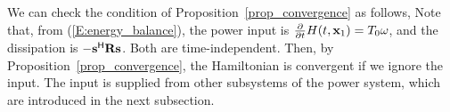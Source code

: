 \begin{comment}
Note that, compared to the system considered in Section~\ref{sec_contraction}, the SG system has the additional state variable $\theta$ which does not affect the definition of the Hamiltonian, i.e., $\frac{\partial H}{\partial \theta} = 0$. However, it can be easily checked that all the machinery from Section~\ref{sec_contraction} still works for the system (\ref{E:SM_model}) if we (i) use the equations for $\vect x$ to generate the equivalence classes, i.e., using
\begin{align*}
    \begin{bmatrix}[1.2]
        \dot{\vect x}_1(\tau) \\
        \dot\theta(\tau)
    \end{bmatrix} &= \begin{bmatrix}
        \mathcal W \left[ (\matr J(\vect x(\tau)) - \matr R) \nabla H(t, \vect x_1(\tau)) + \matr G \vect u(\tau)\right] \\
        \omega(\tau)
    \end{bmatrix} \\
    \vect y(\tau) &= \matr G^\herm \nabla H(t, \vect x_1(\tau)),
\end{align*}
where $\vect u(\tau)$ is supplied from the other open subsystems,
and (ii) only include $\vect x_1$ in the definition of the quotient distance in (\ref{E:projection}), i.e.,
\begin{equation*}
    \mathcal P(t, \vect x) \begin{bmatrix}
        0 \\
        0 \\
        1
    \end{bmatrix} = 0_3.
\end{equation*}
In particular, the system (\ref{E:SM_model}) without considering the input $\vect u$, is HC if $\matr R > 0$ and $D^2 H(t, \vect x_1) \geq c > 0$, which are true. The input is supplied from other subsystems of the power system, which are introduced in the next subsection.
\end{comment}


We can check the condition of Proposition~\ref{prop_convergence} as follows, Note that, from (\ref{E:energy_balance}), the power input is
$\frac{\partial}{\partial t} H(t, \mathbf{x}_1) = T_0 \omega$,
and the dissipation is
$-\mathbf{s}^{\mathsf{H}} \mathbf{R} \mathbf{s}$.
Both are time-independent. Then, by Proposition~\ref{prop_convergence}, the Hamiltonian is convergent if we ignore the input. The input is supplied from other subsystems of the power system, which are introduced in the next subsection.


